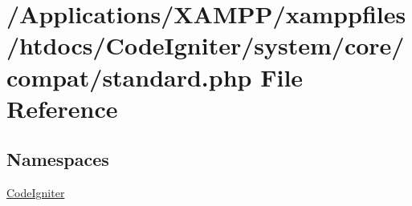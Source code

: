 \hypertarget{standard_8php}{}\section{/\+Applications/\+X\+A\+M\+P\+P/xamppfiles/htdocs/\+Code\+Igniter/system/core/compat/standard.php File Reference}
\label{standard_8php}
\subsection*{Namespaces}
\begin{DoxyCompactItemize}
\item 
 \mbox{\hyperlink{namespace_code_igniter}{Code\+Igniter}}
\end{DoxyCompactItemize}
